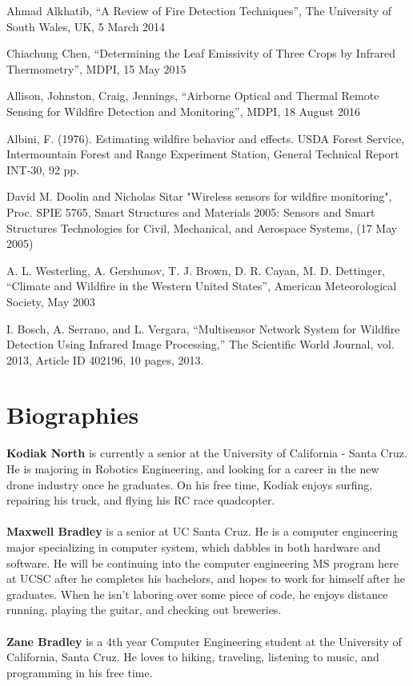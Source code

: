 \documentclass[12pt,journal,compsoc]{IEEEtran}
\begin{document}
\begin{thebibliography}{2}
Ahmad Alkhatib, “A Review of Fire Detection Techniques”, The University of South Wales, UK, 5 March 2014

Chiachung Chen, “Determining the Leaf Emissivity of Three Crops by Infrared Thermometry”, MDPI, 15 May 2015

Allison, Johnston, Craig, Jennings, “Airborne Optical and Thermal Remote Sensing for Wildfire Detection and Monitoring”, MDPI, 18 August 2016

Albini, F. (1976). Estimating wildfire behavior and effects. USDA Forest Service, Intermountain Forest and Range Experiment Station, General Technical Report INT-30, 92 pp.

David M. Doolin and Nicholas Sitar "Wireless sensors for wildfire monitoring", Proc. SPIE 5765, Smart Structures and Materials 2005: Sensors and Smart Structures Technologies for Civil, Mechanical, and Aerospace Systems, (17 May 2005)

A. L. Westerling, A. Gershunov, T. J. Brown, D. R. Cayan, M. D. Dettinger, “Climate and Wildfire in the Western United States”, American Meteorological Society, May 2003

I. Bosch, A. Serrano, and L. Vergara, “Multisensor Network System for Wildfire Detection Using Infrared Image Processing,” The Scientific World Journal, vol. 2013, Article ID 402196, 10 pages, 2013.

\end{thebibliography}

\vspace{1cm}

\section*{Biographies}
\textbf{Kodiak North}
is currently a senior at the University of California - Santa Cruz. He is majoring in Robotics Engineering, and looking for a career in the new drone industry once he graduates. On his free time, Kodiak enjoys surfing, repairing his truck, and flying his RC race quadcopter.\\\\
\noindent
\textbf{Maxwell Bradley}
is a senior at UC Santa Cruz. He is a computer engineering major specializing in computer system, which dabbles in both hardware and software. He will be continuing into the computer engineering MS program here at UCSC after he completes his bachelors, and hopes to work for himself after he graduates. When he isn't laboring over some piece of code, he enjoys distance running, playing the guitar, and checking out breweries.\\\\
\noindent
\textbf{Zane Bradley}
is a 4th year Computer Engineering student at the University of California, Santa Cruz. He loves to hiking, traveling, listening to music, and programming in his free time.
\end{document}
